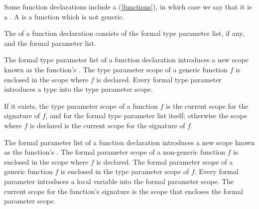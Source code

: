 \documentclass[makeidx]{article}
\begin{document}
\LMHash{}%
Some function declarations include a
 (\ref{functions}),
in which case we say that it is a
.
A 
is a function which is not generic.

\LMHash{}%
The  of a function declaration consists of
the formal type parameter list, if any, and the formal parameter list.


\LMHash{}%
The formal type parameter list of a function declaration introduces
a new scope known as the function's
.
The type parameter scope of a generic function $f$ is enclosed in
the scope where $f$ is declared.
Every formal type parameter introduces a type into the type parameter scope.

\LMHash{}%
If it exists, the type parameter scope of a function $f$ is
the current scope for the signature of $f$,
and for the formal type parameter list itself;
otherwise the scope where $f$ is declared is
the current scope for the signature of $f$.


\LMHash{}%
The formal parameter list of a function declaration introduces
a new scope known as the function's
.
The formal parameter scope of a non-generic function $f$ is enclosed in
the scope where $f$ is declared.
The formal parameter scope of a generic function $f$ is enclosed in
the type parameter scope of $f$.
Every formal parameter introduces a local variable into
the formal parameter scope.
The current scope for the function's signature is
the scope that encloses the formal parameter scope.

\end{document}
